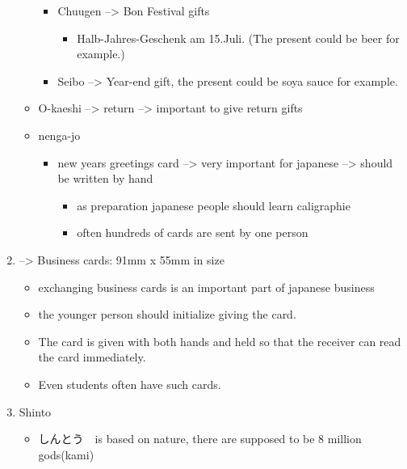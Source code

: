 \documentclass{article}
\newcommand\tabni[1][0.2cm]{\hspace*{#1}}
\begin{document}
\begin{enumerate}[itemsep=-6pt]
\begin{itemize}
\begin{itemize}%
\item {} \tabni Chuugen --> Bon Festival gifts
\begin{itemize}
\item Halb-Jahres-Geschenk am 15.Juli. (The present could be beer for example.)
\end{itemize}
\item {} \tabni Seibo
 --> Year-end gift, the present could be soya sauce for example.
\end{itemize}
\item {} O-kaeshi --> return --> important to give return gifts \\
\item {} nenga-jo
\begin{itemize}%
\item new years greetings card --> very important for japanese --> should be written by hand
\begin{itemize}
\item as preparation japanese people should learn caligraphie
\item often hundreds of cards are sent by one person \\
\end{itemize} 
\end{itemize}
\end{itemize}
\item {} --> Business cards: 91mm x 55mm in size
\begin{itemize}%
\item exchanging business cards is an important part of japanese business
\item the younger person should initialize giving the card. 
\item The card is given with both hands and held so that the receiver can read the card immediately. 
\item Even students often have such cards. \\
\end{itemize}
\item {} \tabni Shinto
\begin{itemize}%
\item しんとう　is based on nature, there are supposed to be 8 million gods(kami)

\end{itemize}
\end{enumerate}
\end{document}
